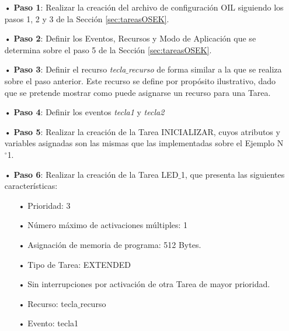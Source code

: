 \documentclass[12pt,letterpaper]{article}
\begin{document}
\begin{enumerate}
\item[•]\textbf{Paso 1}: Realizar la creación del archivo de configuración OIL siguiendo los pasos 1, 2 y 3 de la Sección \ref{sec:tareasOSEK}.
\item[•]\textbf{Paso 2}: Definir los Eventos, Recursos y Modo de Aplicación que se determina sobre el paso 5 de la Sección \ref{sec:tareasOSEK}.
\item[•]\textbf{Paso 3}: Definir el recurso \textit{tecla$\_$recurso} de forma similar a la que se realiza sobre el paso anterior. Este recurso se define por propósito ilustrativo, dado que se pretende mostrar como puede asignarse un recurso para una Tarea.
\item[•]\textbf{Paso 4}: Definir los eventos \textit{tecla1} y \textit{tecla2}
\item[•]\textbf{Paso 5}: Realizar la creación de la Tarea INICIALIZAR, cuyos atributos y variables asignadas son las mismas que las implementadas sobre el Ejemplo N$^{\circ}$1.

\item[•]\textbf{Paso 6}: Realizar la creación de la Tarea LED$\_$1, que presenta las siguientes características:
\begin{enumerate}
\item[•]Prioridad: 3
\item[•]Número máximo de activaciones múltiples: 1
\item[•]Asignación de memoria de programa: 512 Bytes.
\item[•]Tipo de Tarea: EXTENDED
\item[•]Sin interrupciones por activación de otra Tarea de mayor prioridad.
\item[•]Recurso: tecla$\_$recurso
\item[•]Evento: tecla1
\end{enumerate}


\end{enumerate}
\end{document}
